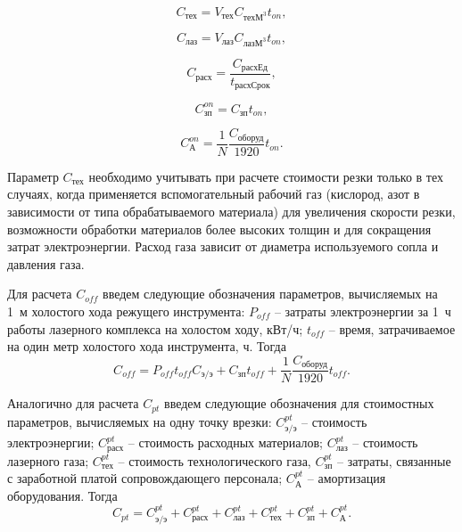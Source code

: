 \documentclass[11pt,twoside,openany]{report}
\begin{document}
\begin{equation}
  C_\text{тех} =
  V_\text{тех} C_{\text{техМ}^3} t_{on}
  ,
  \label{c-on-teh}
\end{equation}

\begin{equation}
  C_\text{лаз} =
  V_\text{лаз} C_{\text{лазМ}^3} t_{on}
  ,
  \label{c-on-laz}
\end{equation}

\begin{equation}
  C_\text{расх} =
  \frac{C_\text{расхЕд}}{t_\text{расхСрок}}
  ,
  \label{c-on-rasx}
\end{equation}

\begin{equation}
  C_\text{зп}^{on} =
  C_\text{зп} t_{on}
  ,
  \label{c-on-zp}
\end{equation}

\begin{equation}
  C_\text{А}^{on} =
  \frac{1}N \frac{C_\text{оборуд}}{1920} t_{on}
  .
  \label{c-on-A}
\end{equation}

Параметр
$C_\text{тех}$
необходимо учитывать при расчете стоимости резки
только в тех случаях,
когда применяется вспомогательный рабочий газ
(кислород, азот в зависимости от типа обрабатываемого материала)
для увеличения скорости резки,
возможности обработки материалов более высоких толщин
и для сокращения затрат электроэнергии.
Расход газа зависит от диаметра используемого сопла и давления газа.

Для расчета
$C_{off}$
введем следующие обозначения параметров,
вычисляемых на 1~м холостого хода режущего инструмента:
$P_{off}$ -- затраты электроэнергии за 1~ч работы лазерного комплекса на холостом ходу, кВт/ч;
$t_{off}$ -- время, затрачиваемое на один метр холостого хода инструмента, ч.
Тогда
\begin{equation}
  C_{off} =
  P_{off} t_{off} C_\text{э/э}
  + C_\text{зп} t_{off}
  + \frac{1}N \frac{C_\text{оборуд}}{1920} t_{off}
  .
  \label{c-off}
\end{equation}

Аналогично для расчета
$C_{pt}$
введем следующие обозначения для стоимостных параметров,
вычисляемых на одну точку врезки:
$C_\text{э/э}^{pt}$ -- стоимость электроэнергии;
$C_\text{расх}^{pt}$ -- стоимость расходных материалов;
$C_\text{лаз}^{pt}$ -- стоимость лазерного газа;
$C_\text{тех}^{pt}$ -- стоимость технологического газа,
$C_\text{зп}^{pt}$ -- затраты, связанные с заработной платой сопровождающего персонала;
$C_\text{А}^{pt}$ -- амортизация оборудования.
Тогда
\begin{equation}
  C_{pt} =
  C_\text{э/э}^{pt} +
  C_\text{расх}^{pt} +
  C_\text{лаз}^{pt} +
  C_\text{тех}^{pt} +
  C_\text{зп}^{pt} +
  C_\text{А}^{pt}
  .
  \label{c-pt}
\end{equation}
\end{document}
